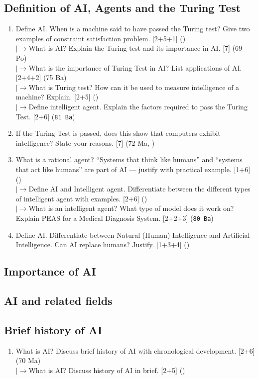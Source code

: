 \documentclass[12pt]{article}
\newcommand{\lb}{\\$\left|\rightarrow\right.$}
\begin{document}
  \subsection{Definition of AI, Agents and the Turing Test}
    \begin{enumerate}[topsep=0pt, noitemsep]
      \item Define AI. When is a machine said to have passed the Turing test? Give two examples of constraint satisfaction problem. \hfill [2+5+1] ()
        \lb What is AI? Explain the Turing test and its importance in AI. \hfill [7] (69 Po)
        \lb What is the importance of Turing Test in AI? List applications of AI. \hfill [2+4+2] (75 Ba)
        \lb What is Turing test? How can it be used to measure intelligence of a machine? Explain. \hfill [2+5] ()
        \lb Define intelligent agent. Explain the factors required to pass the Turing Test. \hfill [2+6] (\texttt{81 Ba})

      \item If the Turing Test is passed, does this show that computers exhibit intelligence? State your reasons. \hfill [7] (72 Ma, )

      \item What is a rational agent? ``Systems that think like humans'' and ``systems that act like humans'' are part of AI --- justify with practical example. \hfill [1+6] ()
        \lb Define AI and Intelligent agent. Differentiate between the different types of intelligent agent with examples. \hfill [2+6] ()
        \lb What is an intelligent agent? What type of model does it work on? Explain PEAS for a Medical Diagnosis System. \hfill [2+2+3] (\texttt{80 Ba})

      \item Define AI. Differentiate between Natural (Human) Intelligence and Artificial Intelligence. Can AI replace humans? Justify. \hfill [1+3+4] ()
    \end{enumerate}

  \subsection{Importance of AI}
  \subsection{AI and related fields}
  \subsection{Brief history of AI}
    \begin{enumerate}[topsep=0pt, noitemsep]
      \item What is AI? Discuss brief history of AI with chronological development. \hfill [2+6] (70 Ma)
        \lb What is AI? Discuss history of AI in brief. \hfill [2+5] ()
    \end{enumerate}
\end{document}
